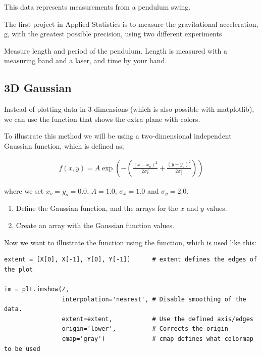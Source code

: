 \documentclass{article}
\begin{document}
This data represents measurements from a pendulum swing.


The first project in Applied Statistics is to measure the gravitational acceleration, g, with the greatest possible precision, using two different experiments

Measure length and period of the pendulum. Length is measured
with a measuring band and a laser, and time by your hand.

\newpage
\subsection{3D Gaussian}

Instead of plotting data in 3 dimensions (which is also possible with matplotlib), we can use the  function that shows the extra plane with colors.

To illustrate this method we will be using a two-dimensional independent Gaussian function, which is defined as;

\begin{align}
  f(x,y) = A \exp \left ( - \left ( \frac{(x - x_o)^2}{2\sigma_x^2} + \frac{(y - y_o)^2}{2\sigma_y^2} \right ) \right )
\end{align}

where we set $x_o = y_o = 0.0$, $A = 1.0$, $\sigma_x = 1.0$ and $\sigma_y = 2.0$.\\


\begin{enumerate}

    \item Define the Gaussian function, and the arrays for the $x$ and $y$ values.

    \item Create an array  with the Gaussian function values.

\end{enumerate}

Now we want to illustrate the function using the  function, which is used like this:

\begin{lstlisting}
extent = [X[0], X[-1], Y[0], Y[-1]]      # extent defines the edges of the plot

im = plt.imshow(Z,
                interpolation='nearest', # Disable smoothing of the data.
                extent=extent,           # Use the defined axis/edges
                origin='lower',          # Corrects the origin
                cmap='gray')             # cmap defines what colormap to be used
\end{lstlisting}
\end{document}
